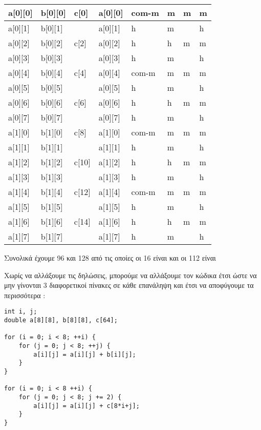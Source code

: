 \documentclass[10pt]{assignment}f
\begin{document}
\begin{center}
\begin{tabularx}{\textwidth}{|Z|Z|Z|Z|Y|Y|Y|Y|}
\hline
a[0][0] & b[0][0] & c[0] & a[0][0] & com-m & m & m & m \\
\hline
a[0][1] & b[0][1] &      & a[0][1] & h & m & & h \\
\hline
a[0][2] & b[0][2] & c[2] & a[0][2] & h & h & m & m \\
\hline
a[0][3] & b[0][3] &      & a[0][3] & h & m & & h \\
\hline
a[0][4] & b[0][4] & c[4] & a[0][4] & com-m & m & m & m \\
\hline
a[0][5] & b[0][5] &      & a[0][5] & h & m & & h \\
\hline
a[0][6] & b[0][6] & c[6] & a[0][6] & h & h & m & m \\
\hline
a[0][7] & b[0][7] &      & a[0][7] & h & m & & h \\
\hline
a[1][0] & b[1][0] & c[8] & a[1][0] & com-m & m & m & m \\
\hline
a[1][1] & b[1][1] &      & a[1][1] & h & m & & h \\
\hline
a[1][2] & b[1][2] & c[10] & a[1][2] & h & h & m & m \\
\hline
a[1][3] & b[1][3] &       & a[1][3] & h & m & & h \\
\hline
a[1][4] & b[1][4] & c[12] & a[1][4] & com-m & m & m & m \\
\hline
a[1][5] & b[1][5] &       & a[1][5] & h & m & & h \\
\hline
a[1][6] & b[1][6] & c[14] & a[1][6] & h & h & m & m \\
\hline
a[1][7] & b[1][7] &       & a[1][7] & h & m & & h \\
\hline
\end{tabularx}
\end{center}
\vspace{4pt}

Συνολικά έχουμε 96  και 128  από τις οποίες οι 16 είναι  και οι 112 είναι 

Χωρίς να αλλάξουμε τις δηλώσεις, μπορούμε να αλλάξουμε τον κώδικα έτσι ώστε να μην γίνονται  3 διαφορετικοί πίνακες σε κάθε επανάληψη και έτσι να αποφύγουμε τα περισσότερα :

\begin{center}
\begin{verbatim}
int i, j;
double a[8][8], b[8][8], c[64];

for (i = 0; i < 8; ++i) {
    for (j = 0; j < 8; ++j) {
        a[i][j] = a[i][j] + b[i][j];
    }
}

for (i = 0; i < 8 ++i) {
    for (j = 0; j < 8; j += 2) {
        a[i][j] = a[i][j] + c[8*i+j];
    }
}
\end{verbatim}
\end{center}
\end{document}
